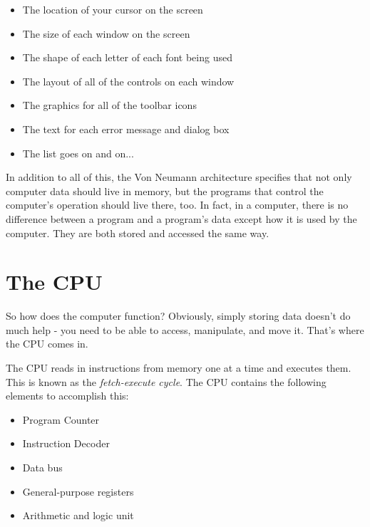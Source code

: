 \begin{itemize}\item The location of your cursor on the screen 
\item The size of each window on the screen 
\item The shape of each letter of each font being used 
\item The layout of all of the controls on each window 
\item The graphics for all of the toolbar icons 
\item The text for each error message and dialog box 
\item The list goes on and on... 
\end{itemize}

In addition to all of this, the Von Neumann architecture specifies that
not only computer data should live in memory, but the programs that 
control the computer's operation should live there, too.  In fact, in 
a computer, there is no difference between a program and a program's
data except how it is used by the computer.  They are both stored and
accessed the same way.

\section{The CPU}

So how does the computer function?  Obviously, simply storing data doesn't
do much help - you need to be able to access, manipulate, and move it.  That's where
the CPU comes in.

The CPU reads in instructions from memory one at a time and executes them.
This is known as the \emph{fetch-execute cycle}.  The CPU
contains the following elements to accomplish this:

\begin{itemize}\item Program Counter 
\item Instruction Decoder 
\item Data bus 
\item General-purpose registers 
\item Arithmetic and logic unit 
\end{itemize}

